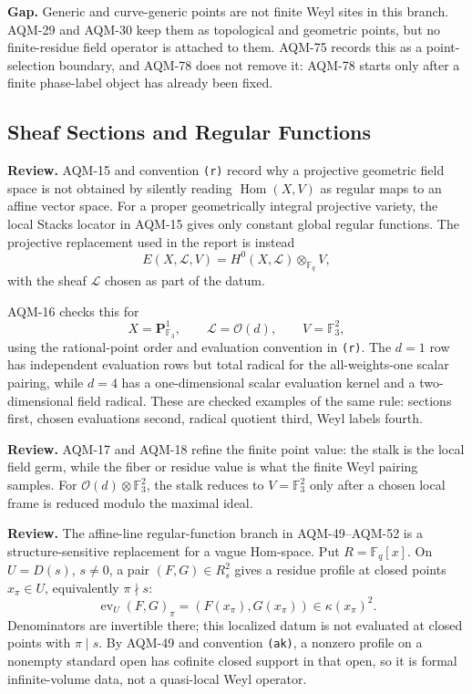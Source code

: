 \textbf{Gap.}  Generic and curve-generic points are not finite Weyl sites in
this branch.  AQM-29 and AQM-30 keep them as topological and geometric points,
but no finite-residue field operator is attached to them.  AQM-75 records
this as a point-selection boundary, and AQM-78 does not remove it: AQM-78
starts only after a finite phase-label object has already been fixed.

\subsection{Sheaf Sections and Regular Functions}

\textbf{Review.}  AQM-15 and convention \texttt{(r)} record why a projective
geometric field space is not obtained by silently reading
\(\operatorname{Hom}(X,V)\) as regular maps to an affine vector space.  For a
proper geometrically integral projective variety, the local Stacks locator in
AQM-15 gives only constant global regular functions.  The projective
replacement used in the report is instead
\[
  E(X,\mathcal L,V)=H^0(X,\mathcal L)\otimes_{\mathbb F_q}V,
\]
with the sheaf \(\mathcal L\) chosen as part of the datum.

AQM-16 checks this for
\[
  X=\mathbf P^1_{\mathbb F_3},\qquad
  \mathcal L=\mathcal O(d),\qquad V=\mathbb F_3^2,
\]
using the rational-point order and evaluation convention in
\texttt{(r)}.  The \(d=1\) row has independent evaluation rows but total
radical for the all-weights-one scalar pairing, while \(d=4\) has a
one-dimensional scalar evaluation kernel and a two-dimensional field radical.
These are checked examples of the same rule: sections first, chosen
evaluations second, radical quotient third, Weyl labels fourth.

\textbf{Review.}  AQM-17 and AQM-18 refine the finite point value: the stalk
is the local field germ, while the fiber or residue value is what the finite
Weyl pairing samples.  For \(\mathcal O(d)\otimes\mathbb F_3^2\), the stalk
reduces to \(V=\mathbb F_3^2\) only after a chosen local frame is reduced
modulo the maximal ideal.

\textbf{Review.}  The affine-line regular-function branch in AQM-49--AQM-52 is a
structure-sensitive replacement for a vague Hom-space.  Put \(R=\mathbb F_q[x]\).
On \(U=D(s)\), \(s\ne0\), a pair
\((F,G)\in R_s^2\) gives a residue profile at closed points \(x_\pi\in U\),
equivalently \(\pi\nmid s\):
\[
  \operatorname{ev}_U(F,G)_\pi=(F(x_\pi),G(x_\pi))\in\kappa(x_\pi)^2.
\]
Denominators are invertible there; this localized datum is not evaluated at
closed points with \(\pi\mid s\).  By AQM-49 and convention \texttt{(ak)}, a
nonzero profile on a nonempty standard open has cofinite closed support in that
open, so it is formal infinite-volume data, not a quasi-local Weyl operator.

